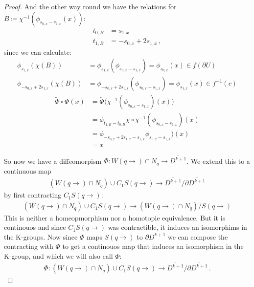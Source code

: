 \begin{proof}
And the other way round we have the relations for $B\coloneq \chi^{-1}(\phi_{s_{0,x}-s_{1,x}}(x))$:
\begin{align*}
	t_{0,B}&=	s_{1,x}\\
	t_{1,B}&=	-s_{0,x}+2s_{1,x}\, , 
\end{align*}
since we can calculate:
\begin{align*}
	\phi_{s_{1,x}}(\chi(B))			  &= \phi_{s_{1,x}}(\phi_{s_{0,x}-s_{1,x}})=\phi_{s_{0,x}}(x)\in f(\partial U)\\
	\phi_{-s_{0,x}+2s_{1,x}}(\chi(B)) &= \phi_{-s_{0,x}+2s_{1,x}}(\phi_{s_{0,x}-s_{1,x}})= \phi_{s_{1,x}}(x) \in f^{-1}(c)
\end{align*}
\begin{align*}
	\tilde{\Phi}\circ \Phi(x)
	&=	\tilde{\Phi} \big( \chi^{-1}(\phi_{s_{0,x}-s_{1,x}})(x) \big)  \\
	&=	\phi_{t_{1,B}-t_{0,B}}\chi \circ \chi^{-1}(\phi_{s_{0,x}-s_{1,x}})(x) \\
	&=  \phi_{	-s_{0,x}+2s_{1,x}-s_{1,x}}\phi_{s_{0,x}-s_{1,x}})(x) \\
	&=  x
\end{align*}

So now we have a diffeomorpism $\Phi:W(q\to)\cap N_q\to \overline{D^{k+1}}$. We extend this to a continuous map 
\begin{align*}
	(W(q\to)\cap N_q)\cup C_1S(q\to) \to \overline{D^{k+1}}\slash \partial \overline{D^{k+1}}
\end{align*} by first contracting $C_1S(q\to)$:
\begin{align*}
	(W(q\to)\cap N_q)\cup C_1S(q\to) \to 	(W(q\to)\cap N_q) \big/ S(q\to)
\end{align*} This is neither a homeopmorphism nor a homotopie equivalence. But it is continouos and since $C_1S(q\to)$ was contractible, it induces an isomorphims in the K-groups. Now since $\Phi$ maps $S(q\to)$ to $\partial D^{k+1}$ we can compose the contracting with $\Phi$ to get a continouos map that induces an isomorphism in the K-group, and which we will also call $\Phi$:
\begin{align*}
	\Phi: (W(q\to)\cap N_q)\cup C_1S(q\to) \to \overline{D^{k+1}}\slash \partial \overline{D^{k+1}} \,. 
\end{align*}


\end{proof}

